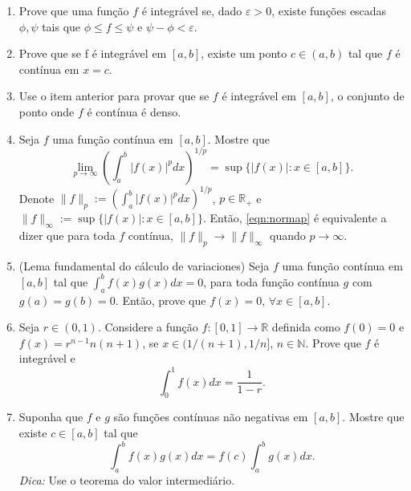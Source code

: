 \documentclass{article}
\theoremstyle{plain}
\theoremstyle{definition}
\theoremstyle{remark}
\newcommand{\R}{{\mathbb R}}
\begin{document}
\begin{enumerate}
  \item Prove que uma função $f$ é integrável se, dado $\varepsilon>0$, existe funções escadas $\phi, \psi$ tais que $\phi \leq f \leq \psi$ e $\psi-\phi < \varepsilon$.   
  \item Prove que se f é integrável em $[a,b]$, existe um ponto $c \in(a,b)$
  tal que $f$ é contínua em $x=c$.
  \item Use o item anterior para provar  que se $f$ é integrável em $[a,b]$, 
  o conjunto de ponto onde $f$ é contínua é denso.
  \item Seja $f$ uma função contínua em $[a,b]$.
  Mostre que 
    \begin{equation}\label{eqn:normap}
    \lim_{p \rightarrow \infty} \left(\int_{a}^{b} |f(x)|^{p}dx\right)^{1/p}=
  \sup\{|f(x)|:x \in [a,b]\}.
    \end{equation}
 Denote
  $\|f\|_p:=\left(\int_{a}^{b} |f(x)|^{p}dx\right)^{1/p}$, $p \in \mathbb{R}_{+}$ e  $\|f\|_{\infty}:=\sup\{|f(x)|:x \in [a,b]\}$. Então,  
  \eqref{eqn:normap} é equivalente a dizer que  para toda $f$ contínua, 
  $\|f\|_{p} \rightarrow \|f\|_{\infty}$ quando $p \rightarrow \infty$.
  \item (Lema fundamental do cálculo de variaciones) Seja $f$ uma função contínua em $[a,b]$ tal que
  $\int_{a}^{b} f(x)g(x)dx=0$, para toda função contínua $g$ com $g(a)=g(b)=0$. Então, prove que $f(x)=0$, $\forall x \in [a,b]$.
  \item Seja $r \in (0,1)$. Considere a função 
  $f:[0,1]\rightarrow \R$
  definida como $f(0)=0$ e $f(x)=r^{n-1}n(n+1)$, 
  se $x \in (1/(n+1), 1/n]$, $n \in \mathbb{N}$. Prove que $f$ é integrável 
  e $$\int_{0}^{1} f(x)dx= \frac{1}{1-r}.$$
   \item Suponha que 
  $f$ e $g$ são funções contínuas não negativas em $[a,b]$. Mostre que existe $c \in [a,b]$ tal que 
   $$\int_{a}^{b} f(x)g(x)dx= f(c) \int_{a}^{b} g(x)dx. $$
   {\it Dica:} Use o teorema do valor intermediário.
\end{enumerate}
\end{document}

